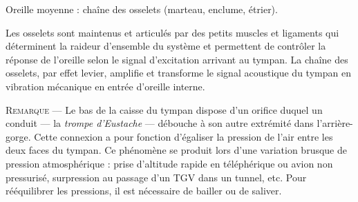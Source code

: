 \begin{marginfigure}
\caption{\label{fig:V.15}Oreille moyenne : chaîne des osselets (marteau, enclume, étrier).}
\end{marginfigure}


Les osselets sont maintenus et articulés par des petits muscles et ligaments qui déterminent la raideur d'ensemble du système et permettent de contrôler la réponse de l'oreille selon le signal d'excitation arrivant au tympan. %
La chaîne des osselets, par effet levier, amplifie et transforme le signal acoustique du tympan en vibration mécanique en entrée d'oreille interne.

\textsc{Remarque ---} Le bas de la caisse du tympan dispose d'un orifice duquel un conduit 
--- la \emph{trompe d'Eustache} --- débouche à son autre extrémité dans l'arrière-gorge.
Cette connexion a pour fonction d'égaliser la pression de l'air entre les deux faces du tympan.
Ce phénomène se produit lors d'une variation brusque de pression atmosphérique : prise d'altitude rapide en téléphérique ou avion non pressurisé, surpression au passage d'un TGV dans un tunnel, etc. Pour rééquilibrer les pressions, il est nécessaire de bailler ou de saliver.

